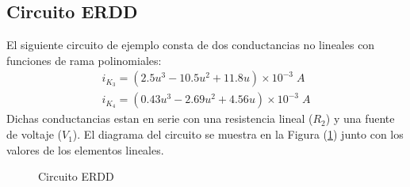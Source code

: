 \documentclass[conference,letterpaper,onecolumn]{IEEEtran}
\begin{document}
\begin{table}[!h]
\center{
\footnotesize{
\begin{tabular}{||c|c|c|c||}
\hline\hline
($n+m$)-\'esima & ($n+m-1$) & \# de & Tiempo \\
Ecuaci\'on en  & Ecuaciones en &  Ra\'{\i}ces  & Total \\
 Chao      & Optimizaci\'on &     &   \\
\hline\hline
${V_1}$ & \ding{172},\ding{173} & 1 & 3.000 \\ \hline
${V_1}$ & \ding{172},${V_1}$ & 1 & 3.550  \\ \hline
${V_1}$ & \ding{173},${V_1}$ & 1 & 3.569  \\ \hline
\ding{173} & \ding{172},\ding{173} & 1 & 3.120  \\ \hline
\ding{173} & \ding{172},${V_1}$ & 1 & 3.089  \\ \hline
\ding{173} & \ding{173},${V_1}$ & 1 & 3.130  \\ \hline
\ding{172} & \ding{172},\ding{173} & 3 & 4.369  \\ \hline
\ding{172} & \ding{172},${V_1}$ & 3 & 4.139  \\ \hline
\ding{172}  & \ding{173},${V_1}$ & 3 & 3.999 \\ \hline \hline
\end{tabular}
}}
\caption{Simulaciones con el m\'etodo de  Chao del circuito ERD}
\label{ERDchao}
\end{table}

\subsection{Circuito ERDD}
El siguiente circuito de ejemplo consta de dos
conductancias no lineales con funciones de rama polinomiales:
\begin{displaymath}
\begin{array}{r}
i_{K_3}=(2.5u^3-10.5u^2+11.8u)\times 10^{-3} \;A \\
i_{K_4}=(0.43u^3-2.69u^2+4.56u)\times 10^{-3} \;A
\end{array}
\end{displaymath}
Dichas conductancias estan en serie con una resistencia lineal ($R_2$) y una fuente de voltaje
($V_1$). El diagrama del circuito se muestra en la Figura (\ref{cirERDD})
junto con los valores de los elementos lineales.

\begin{figure}[!h]
\centerline{
\epsfxsize=70mm
}
\caption{Circuito ERDD}
\label{cirERDD}
\end{figure}
\end{document}
